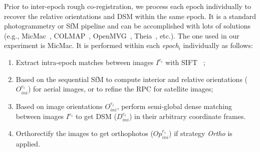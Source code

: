 Prior to inter-epoch rough co-registration, we process each epoch individually to recover the relative orientations and \ac{DSM} within the same epoch. It is a standard photogrammetry or \ac{SfM} pipeline and can be accomplished with lots of solutions (e.g., MicMac~\cite{deseilligny2011apero}, COLMAP~\cite{schonberger2016structure}, {OpenMVG~\cite{openMVG}, Theia~\cite{theia}, etc.}). The one used in our experiment is MicMac. It is performed within each \textit{epoch$_i$} individually as follows:
\begin{enumerate}
\item Extract intra-epoch matches between images $I^{e_i}$ with SIFT ~\cite{lowe2004distinctive};
\item Based on the sequential \ac{SfM} to compute interior and relative orientations ({$O_{ini}^{e_i}$}) for aerial images, or to refine the \ac{RPC} for satellite images;
\item Based on image orientations $O_{ini}^{e_i}$, perform semi-global dense matching~\cite{mpd:06:sgm} {between images $I^{e_i}$} to get {\ac{DSM} ($D_{ini}^{e_i}$) in their arbitrary coordinate frames.}
\item Orthorectify the images to get orthophotos ($Op_{ini}^{e_i}$) if strategy \textit{Ortho} is applied.
\end{enumerate}
